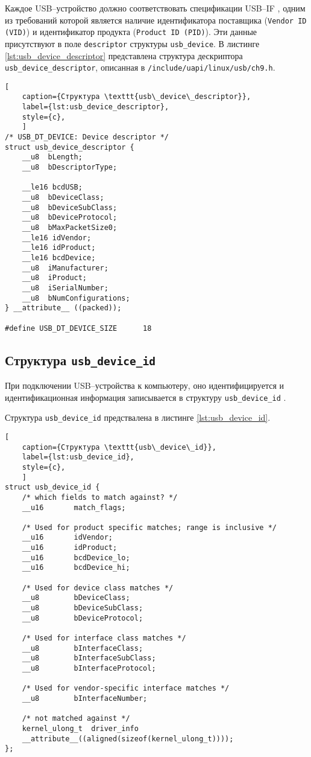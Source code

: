 Каждое USB--устройство должно соответствовать спецификации USB--IF \cite{usb_spec}, одним из требований которой является наличие идентификатора поставщика (\texttt{Vendor ID (VID)}) и идентификатор продукта (\texttt{Product ID (PID)}). Эти данные присутствуют в поле \texttt{descriptor} структуры \texttt{usb\_device}. В листинге \ref{lst:usb_device_descriptor} представлена структура дескриптора \texttt{usb\_device\_descriptor}, описанная в \texttt{/include/uapi/linux/usb/ch9.h}.

\begin{lstlisting}[
	caption={Структура \texttt{usb\_device\_descriptor}},
	label={lst:usb_device_descriptor},
	style={c},
	]
/* USB_DT_DEVICE: Device descriptor */
struct usb_device_descriptor {
	__u8  bLength;
	__u8  bDescriptorType;
	
	__le16 bcdUSB;
	__u8  bDeviceClass;
	__u8  bDeviceSubClass;
	__u8  bDeviceProtocol;
	__u8  bMaxPacketSize0;
	__le16 idVendor;
	__le16 idProduct;
	__le16 bcdDevice;
	__u8  iManufacturer;
	__u8  iProduct;
	__u8  iSerialNumber;
	__u8  bNumConfigurations;
} __attribute__ ((packed));

#define USB_DT_DEVICE_SIZE		18
\end{lstlisting}

\newpage
\subsection{Структура \texttt{usb\_device\_id}}

При подключении USB--устройства к компьютеру, оно идентифицируется и идентификационная информация записывается в структуру \texttt{usb\_device\_id} \cite{usb_device_id}.

Структура \texttt{usb\_device\_id} предствалена в листинге \ref{lst:usb_device_id}.

\begin{lstlisting}[
	caption={Структура \texttt{usb\_device\_id}},
	label={lst:usb_device_id},
	style={c},
	]
struct usb_device_id {
	/* which fields to match against? */
	__u16		match_flags;
	
	/* Used for product specific matches; range is inclusive */
	__u16		idVendor;
	__u16		idProduct;
	__u16		bcdDevice_lo;
	__u16		bcdDevice_hi;
	
	/* Used for device class matches */
	__u8		bDeviceClass;
	__u8		bDeviceSubClass;
	__u8		bDeviceProtocol;
	
	/* Used for interface class matches */
	__u8		bInterfaceClass;
	__u8		bInterfaceSubClass;
	__u8		bInterfaceProtocol;
	
	/* Used for vendor-specific interface matches */
	__u8		bInterfaceNumber;
	
	/* not matched against */
	kernel_ulong_t	driver_info
	__attribute__((aligned(sizeof(kernel_ulong_t))));
};
\end{lstlisting}

